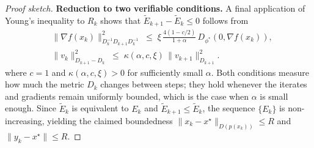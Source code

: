 \documentclass{article}
\theoremstyle{plain}
\theoremstyle{remark}
\begin{document}
\begin{proof}[Proof sketch]
\textbf{Reduction to two verifiable conditions.}
A final application of Young's inequality to $R_k$ shows that
$\widetilde{E}_{k+1} - \widetilde{E}_k \le 0$ follows from
\[
\begin{aligned}
  &\|\nabla f(x_k)\|_{D_k^{-1}D_{k+1}D_k^{-1}}^2
    \;\le\;
    \xi\,\tfrac{4(1-c/2)}{1+\alpha}\,D_{\phi^*}(0,\nabla f(x_k)),\\[6pt]
  &\|v_k\|_{D_{k+1}-D_k}^2
    \;\le\;
    \kappa(\alpha,c,\xi)\,\|v_{k+1}\|_{D_{k+1}}^2.
\end{aligned}
\]
where $c=1$ and $\kappa(\alpha,c,\xi)>0$ for sufficiently small $\alpha$.
Both conditions measure how much the metric $D_k$ changes between steps;
they hold whenever the iterates and gradients remain uniformly bounded,
which is the case when $\alpha$ is small enough.
Since $\widetilde{E}_k$ is equivalent to $E_k$ and $\widetilde{E}_{k+1}\le\widetilde{E}_k$,
the sequence $\{E_k\}$ is non-increasing, yielding the claimed boundedness
$\|x_k - x^\star\|_{D(p(x_k))} \le R$ and $\|y_k - x^\star\| \le R$.
\end{proof}
\end{document}
